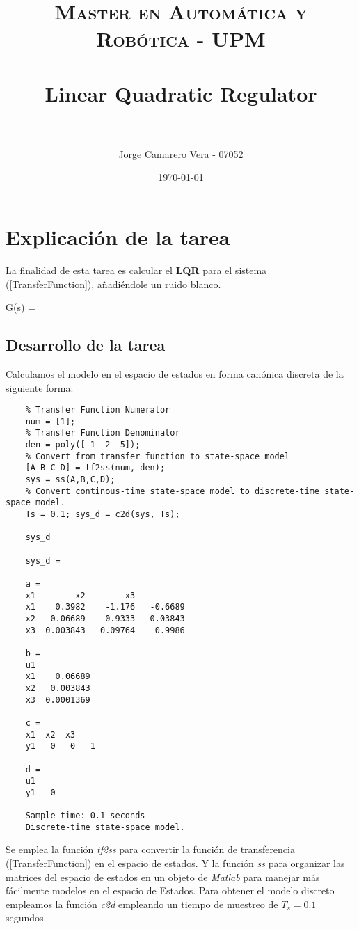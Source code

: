 \documentclass[a4paper, fontsize=11pt]{scrartcl} %
\title{	
	\normalfont \normalsize 
	\textsc{Master en Automática y Robótica - UPM} \\ [25pt] %
	\horrule{0.5pt} \\[0.4cm] %
	\huge Linear Quadratic Regulator \\ %
	\horrule{2pt} \\[0.5cm] %
}
\author{Jorge Camarero Vera - 07052} %
\date{\normalsize\today} %
\numberwithin{equation}{section} %
\numberwithin{figure}{section} %
\numberwithin{table}{section} %
\newenvironment{myalign}{\par\nobreak\large\noindent\align}{\endalign} %
\begin{document}
	\maketitle
	
	\section{Explicación de la tarea}
	
	La finalidad de esta tarea es calcular el \textbf{LQR} para el sistema (\ref{TransferFunction}), añadiéndole un ruido blanco.\\
	
	\begin{myalign}
		G(s) = 
		\label{TransferFunction}
	\end{myalign}
	
	\subsection{Desarrollo de la tarea}
	
	Calculamos el modelo en el espacio de estados en forma canónica discreta de la siguiente forma:
	
	\begin{lstlisting}
	% Transfer Function Numerator
	num = [1];
	% Transfer Function Denominator
	den = poly([-1 -2 -5]);
	% Convert from transfer function to state-space model
	[A B C D] = tf2ss(num, den);
	sys = ss(A,B,C,D);
	% Convert continous-time state-space model to discrete-time state-space model.
	Ts = 0.1; sys_d = c2d(sys, Ts);
	
	sys_d
	
	sys_d =
	
	a = 
	x1        x2        x3
	x1    0.3982    -1.176   -0.6689
	x2   0.06689    0.9333  -0.03843
	x3  0.003843   0.09764    0.9986
	
	b = 
	u1
	x1    0.06689
	x2   0.003843
	x3  0.0001369
	
	c = 
	x1  x2  x3
	y1   0   0   1
	
	d = 
	u1
	y1   0
	
	Sample time: 0.1 seconds
	Discrete-time state-space model.
	\end{lstlisting}
	
	Se emplea la función \textit{tf2ss} para convertir la función de transferencia (\ref{TransferFunction}) en el espacio de estados. Y la función \textit{ss} para organizar las matrices del espacio de estados en un objeto de \textit{Matlab} para manejar más fácilmente modelos en el espacio de Estados. Para obtener el modelo discreto empleamos la función \textit{c2d} empleando un tiempo de muestreo de $T_s = 0.1$ segundos.\\
	
\end{document}
